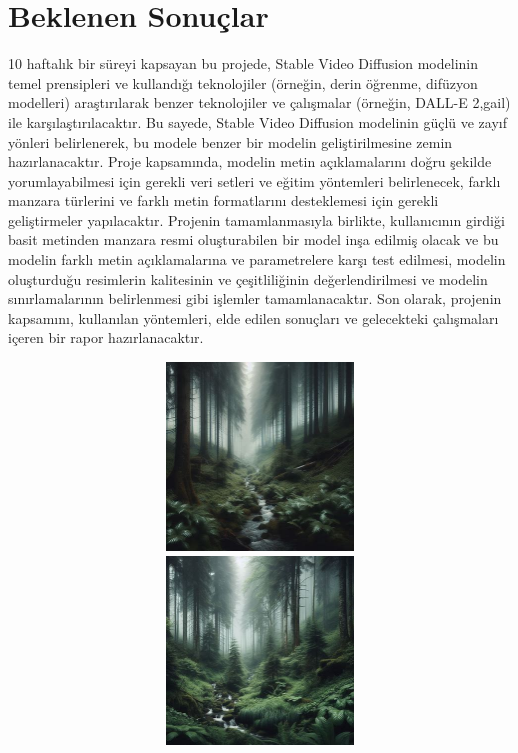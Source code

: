 \documentclass[12pt, a4paper]{article}
\begin{document}
{{						\section{Beklenen Sonuçlar}
						10 haftalık bir süreyi kapsayan bu projede, Stable Video Diffusion modelinin temel prensipleri ve kullandığı teknolojiler (örneğin, derin öğrenme, difüzyon modelleri) araştırılarak benzer teknolojiler ve çalışmalar (örneğin, DALL-E 2,gail) ile karşılaştırılacaktır. Bu sayede, Stable Video Diffusion modelinin güçlü ve zayıf yönleri belirlenerek, bu modele benzer bir modelin geliştirilmesine zemin hazırlanacaktır.
						Proje kapsamında, modelin metin açıklamalarını doğru şekilde yorumlayabilmesi için gerekli veri setleri ve eğitim yöntemleri belirlenecek, farklı manzara türlerini ve farklı metin formatlarını desteklemesi için gerekli geliştirmeler yapılacaktır.
						Projenin tamamlanmasıyla birlikte, kullanıcının girdiği basit metinden manzara resmi oluşturabilen bir model inşa edilmiş olacak ve bu modelin farklı metin açıklamalarına ve parametrelere karşı test edilmesi, modelin oluşturduğu resimlerin kalitesinin ve çeşitliliğinin değerlendirilmesi ve modelin sınırlamalarının belirlenmesi gibi işlemler tamamlanacaktır.
						Son olarak, projenin kapsamını, kullanılan yöntemleri, elde edilen sonuçları ve gelecekteki çalışmaları içeren bir rapor hazırlanacaktır.
						\cite{wang2018assessment}
					
												\begin{figure}[h]
							\centering
							\includegraphics[width=15cm,height=5cm]{OIG4.jpg}
							\includegraphics[width=15cm,height=5cm]{OIG4 (1).jpg}\\
						

\end{figure}}}
\end{document}

